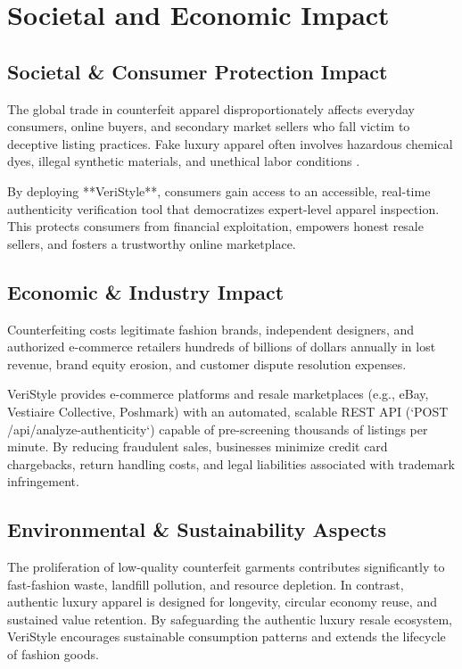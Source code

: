 \chapter{Societal and Economic Impact}

\section{Societal & Consumer Protection Impact}
The global trade in counterfeit apparel disproportionately affects everyday consumers, online buyers, and secondary market sellers who fall victim to deceptive listing practices. Fake luxury apparel often involves hazardous chemical dyes, illegal synthetic materials, and unethical labor conditions \cite{oecd2020trade}. 

By deploying **VeriStyle**, consumers gain access to an accessible, real-time authenticity verification tool that democratizes expert-level apparel inspection. This protects consumers from financial exploitation, empowers honest resale sellers, and fosters a trustworthy online marketplace.

\section{Economic & Industry Impact}
Counterfeiting costs legitimate fashion brands, independent designers, and authorized e-commerce retailers hundreds of billions of dollars annually in lost revenue, brand equity erosion, and customer dispute resolution expenses. 

VeriStyle provides e-commerce platforms and resale marketplaces (e.g., eBay, Vestiaire Collective, Poshmark) with an automated, scalable REST API (`POST /api/analyze-authenticity`) capable of pre-screening thousands of listings per minute. By reducing fraudulent sales, businesses minimize credit card chargebacks, return handling costs, and legal liabilities associated with trademark infringement.

\section{Environmental & Sustainability Aspects}
The proliferation of low-quality counterfeit garments contributes significantly to fast-fashion waste, landfill pollution, and resource depletion. In contrast, authentic luxury apparel is designed for longevity, circular economy reuse, and sustained value retention. By safeguarding the authentic luxury resale ecosystem, VeriStyle encourages sustainable consumption patterns and extends the lifecycle of fashion goods.
